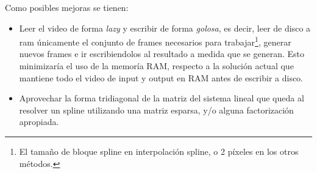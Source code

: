 Como posibles mejoras se tienen:
\begin{itemize}
	 \item Leer el video de forma \emph{lazy} y escribir de forma \emph{golosa}, es decir, leer de disco a ram únicamente el conjunto de frames necesarios para trabajar\footnote{El tamaño de bloque spline en interpolación spline, o 2 píxeles en los otros métodos.}, generar nuevos frames e ir escribiendolos al resultado a medida que se generan. Esto minimizaría el uso de la memoría RAM, respecto a la solución actual que mantiene todo el video de input y output en RAM antes de escribir a disco. 

	 \item Aprovechar la forma tridiagonal de la matriz del sistema lineal que queda al resolver un spline utilizando una matriz esparsa, y/o alguna factorización apropiada. 
\end{itemize}




